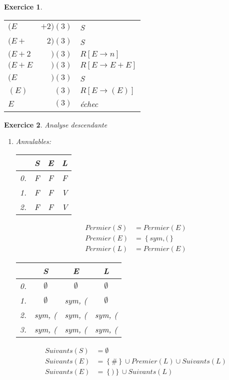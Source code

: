 \documentclass{article}
\theoremstyle{plain}
\newtheorem{exo}{Exercice}%
\begin{document}
\begin{exo}
\begin{enumerate}
\begin{tabular}{| l | r | l |}
      $(E$ & $ + 2) (3)$ & S\\
      $(E + $ & $ 2) (3)$ & S\\
      $(E + 2$ & $) (3)$ & $R[E \to n]$\\
      $(E + E$ & $) (3)$ & $R[E \to E + E]$\\
      $(E$ & $) (3)$ & S\\
      $(E)$ & $(3)$ & $R[E \to (E)]$\\
      $E$ & $(3)$ & échec\\
    \hline
    \end{tabular}
\end{enumerate}
\end{exo}
    

\begin{exo} Analyse descendante
\begin{enumerate}
  \item
    Annulables: 

    \begin{tabular}{c | c | c | c |}
      & S & E & L\\
      \hline
      0. & F & F & F \\
      1. & F & F & V \\
      2. & F & F & V \\
\end{tabular}

    \begin{align*}
      Permier(S) &= Permier(E)\\
      Premier(E) &= \left\{sym, (\right\}\\
      Permier(L) &= Permier(E)
    \end{align*}

    \begin{tabular}{c|c|c|c|}
      & S & E & L \\
      \hline
      0. & $\emptyset$ & $\emptyset$ & $\emptyset$ \\
      1. & $\emptyset$ & sym, (& $\emptyset$ \\
      2. & sym, ( & sym, ( & sym, ( \\
      3. & sym, ( & sym, ( & sym, ( \\
      \hline
    \end{tabular}

    \begin{align*}
      Suivants(S) &= \emptyset \\
      Suivants(E) &= \left\{\#\right\} \cup Premier(L) 
                          \cup Suivants(L)\\
      Suivants(E) &= \left\{)\right\} \cup Suivants(L)\\
    \end{align*}


\end{enumerate}
\end{exo}
\end{document}
